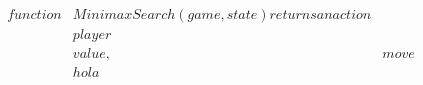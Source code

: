 \documentclass[preview]{standalone}
\begin{document}
\begin{align*}
function &MinimaxSearch(game, state) returns an action \\&player \\& value, &move \\&hola
\end{align*}
\end{document}
